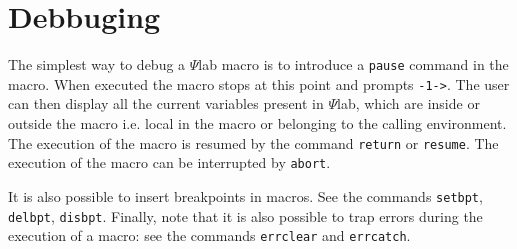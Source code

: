 \section{Debbuging}
The simplest way to debug a $\Psi$lab macro is to introduce
a {\tt pause} command in the macro.
When executed the macro stops at this point and prompts {\tt -1->}.
The user can then display all the current variables present in $\Psi$lab,
which are inside or outside the macro i.e. local in the macro
or belonging to the calling environment. The execution of the macro
is resumed by the command {\tt return} or {\tt resume}.
The execution of the macro can be interrupted by {\tt abort}.

It is also possible to insert breakpoints in macros. See the commands
{\tt setbpt}, {\tt delbpt}, {\tt disbpt}.
Finally, note that it is also possible to trap errors during the 
execution of a macro: 
see the commands {\tt errclear} and {\tt errcatch}.
